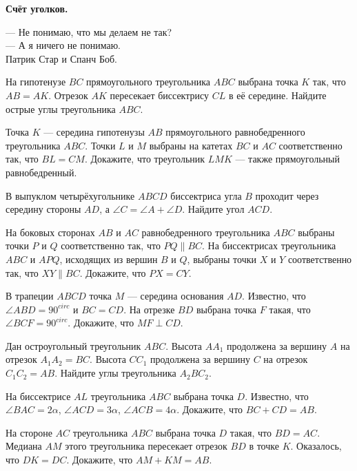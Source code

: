 \centerline{\bf \Huge Счёт уголков.}

\begin{flushright}
        \scriptsize{— Не понимаю, что мы делаем не так?\\
                    — А я ничего не понимаю.\\
                    Патрик Стар и Спанч Боб.}
\end{flushright}

На гипотенузе $BC$ прямоугольного треугольника $ABC$ выбрана точка $K$ так, что $AB = AK$. Отрезок $AK$ пересекает биссектрису $CL$ в её середине. Найдите острые углы треугольника $ABC$.

Точка $K$ --- середина гипотенузы $AB$ прямоугольного равнобедренного треугольника $ABC$. Точки $L$ и $M$ выбраны на катетах $BC$ и $AC$ соответственно так, что $BL = CM$. Докажите, что треугольник $LMK$ --- также прямоугольный равнобедренный.

В выпуклом четырёхугольнике $ABCD$ биссектриса угла $B$ проходит через середину стороны $AD$, а $\angle C = \angle A + \angle D$. Найдите угол $ACD$.

На боковых сторонах $AB$ и $AC$ равнобедренного треугольника $ABC$ выбраны точки $P$ и $Q$ соответственно так, что $PQ \parallel BC$. На биссектрисах треугольника $ABC$ и $APQ$, исходящих из вершин $B$ и $Q$, выбраны точки $X$ и $Y$ соответственно так, что $XY \parallel BC$. Докажите, что $PX = CY$.

В трапеции $ABCD$ точка $M$ --- середина основания $AD$. Известно, что $\angle ABD = 90^{circ}$ и $BC = CD$. На отрезке $BD$ выбрана точка $F$ такая, что $\angle BCF = 90^{circ}$. Докажите, что $MF \perp CD$.

Дан остроугольный треугольник $ABC$. Высота $AA_1$ продолжена за вершину $A$ на отрезок $A_1A_2 = BC$. Высота $CC_1$ продолжена за вершину $C$ на отрезок $C_1C_2 = AB$. Найдите углы треугольника $A_2BC_2$.

На биссектрисе $AL$ треугольника $ABC$ выбрана точка $D$. Известно, что $\angle BAC = 2\alpha$, $\angle ACD = 3\alpha$, $\angle ACB = 4\alpha$. Докажите, что $BC + CD = AB$.

На стороне $AC$ треугольника $ABC$ выбрана точка $D$ такая, что $BD = AC$. Медиана $AM$ этого треугольника пересекает отрезок $BD$ в точке $K$. Оказалось, что $DK = DC$. Докажите, что $AM + KM = AB$.
